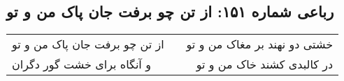 \begin{center}
\section*{رباعی شماره ۱۵۱: از تن چو برفت جان پاک من و تو}
\label{sec:sh151}
\begin{longtable}{l p{0.5cm} r}
از تن چو برفت جان پاک من و تو
&&
خشتی دو نهند بر مغاک من و تو
\\
و آنگاه برای خشت گور دگران
&&
در کالبدی کشند خاک من و تو
\\
\end{longtable}
\end{center}
